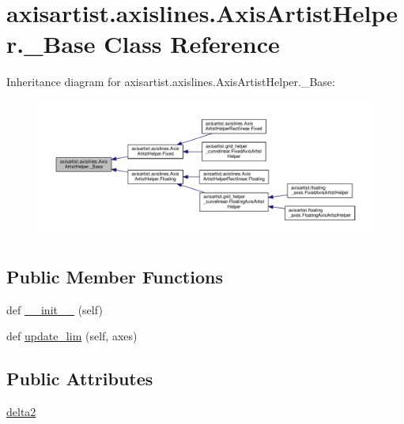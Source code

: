 \hypertarget{classaxisartist_1_1axislines_1_1AxisArtistHelper_1_1__Base}{}\section{axisartist.\+axislines.\+Axis\+Artist\+Helper.\+\_\+\+Base Class Reference}
\label{classaxisartist_1_1axislines_1_1AxisArtistHelper_1_1__Base}


Inheritance diagram for axisartist.\+axislines.\+Axis\+Artist\+Helper.\+\_\+\+Base\+:
\nopagebreak
\begin{figure}[H]
\begin{center}
\leavevmode
\includegraphics[width=350pt]{classaxisartist_1_1axislines_1_1AxisArtistHelper_1_1__Base__inherit__graph}
\end{center}
\end{figure}
\subsection*{Public Member Functions}
\begin{DoxyCompactItemize}
\item 
def \hyperlink{classaxisartist_1_1axislines_1_1AxisArtistHelper_1_1__Base_ab56abf5a1b403df493e5b232f2910ac0}{\+\_\+\+\_\+init\+\_\+\+\_\+} (self)
\item 
def \hyperlink{classaxisartist_1_1axislines_1_1AxisArtistHelper_1_1__Base_ab44098920f810b297e8fb29236471591}{update\+\_\+lim} (self, axes)
\end{DoxyCompactItemize}
\subsection*{Public Attributes}
\begin{DoxyCompactItemize}
\item 
\hyperlink{classaxisartist_1_1axislines_1_1AxisArtistHelper_1_1__Base_a0d5b22b46b259fe4018efb12bdaba68b}{delta2}
\end{DoxyCompactItemize}


